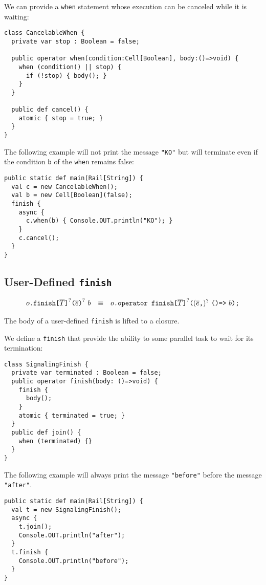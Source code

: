 \begin{example}
  We can provide a \verb+when+ statement whose execution can be
  canceled while it is waiting:
\begin{verbatim}
class CancelableWhen {
  private var stop : Boolean = false;

  public operator when(condition:Cell[Boolean], body:()=>void) {
    when (condition() || stop) {
      if (!stop) { body(); }
    }
  }

  public def cancel() {
    atomic { stop = true; }
  }
}
\end{verbatim}
The following example will not print the message \verb+"KO"+ but will
terminate even if the condition \verb+b+ of the \verb+when+ remains
false:
\begin{verbatim}
public static def main(Rail[String]) {
  val c = new CancelableWhen();
  val b = new Cell[Boolean](false);
  finish {
    async {
      c.when(b) { Console.OUT.println("KO"); }
    }
    c.cancel();
  }
}
\end{verbatim}
\end{example}

\subsection{User-Defined \texttt{finish}}

$$
\begin{array}{rcl}
    {o}\texttt{.finish}\texttt{[}{\overline{T}}\texttt{]}^?\texttt{(}{\overline{e}}\texttt{)}^?~{b}
    & \equiv &
    {o}\texttt{.operator~finish}\texttt{[}{\overline{T}}\texttt{]}^?\texttt{(} ({\overline{e}}\texttt{,})^?~ \texttt{()=>}~{b}\texttt{);}
\end{array}
$$

The body of a user-defined \verb+finish+ is lifted to a closure.

\begin{example}
  We define a \verb+finish+ that provide the ability to some parallel task to wait for its termination:
\begin{verbatim}
class SignalingFinish {
  private var terminated : Boolean = false;
  public operator finish(body: ()=>void) {
    finish {
      body();
    }
    atomic { terminated = true; }
  }
  public def join() {
    when (terminated) {}
  }
}
\end{verbatim}
  The following example will always print the message \verb+"before"+
  before the message \verb+"after"+.
\begin{verbatim}
public static def main(Rail[String]) {
  val t = new SignalingFinish();
  async {
    t.join();
    Console.OUT.println("after");
  }
  t.finish {
    Console.OUT.println("before");
  }
}
\end{verbatim}
\end{example}

